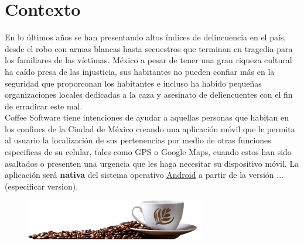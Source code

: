 \chapter{Contexto}
\label{ch:Contexto}

En lo últimos años se han presentando altos índices de delincuencia en el país, desde el robo con armas blancas hasta secuestros que terminan en tragedia para los familiares de las víctimas. México a pesar de tener una gran riqueza cultural ha caído presa de las injusticia, sus habitantes no pueden confiar más en la seguridad que proporconan los habitantes e incluso ha habido pequeñas organizaciones locales dedicadas a la caza y asesinato de deliencuentes con el fin de erradicar este mal.\\

Coffee Software tiene intenciones de ayudar a aquellas personas que habitan en los confines de la Ciudad de México creando una aplicación móvil que le permita al usuario la localización de sus pertenencias por medio de otras funciones especificas de su celular, tales como GPS  o Google Maps, cuando estos han sido asaltados o presenten una urgencia que les haga necesitar su dispositivo móvil. La aplicación será \textbf{nativa} del sistema operativo \href{https://www.android.com/}{Android} a partir de la versión ...(especificar version).


\begin{figure}[hbtp!]
	\begin{center}
		\includegraphics[width=0.7\textwidth]{img/coffe}
	\end{center}
\end{figure}

	




